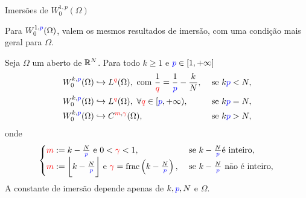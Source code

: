 \begin{frame}{Imersões de \(W_0^{1,p}(\Omega)\)}

Para \(W_0^{1,{\color{blue} p }}(\Omega)\), valem os mesmos resultados de imersão, com uma condição mais geral para \(\Omega\).

\begin{teo}
Seja \(\Omega\) um aberto de \(\mathbb{R}^N\). Para todo \(k\geq 1\) e \({\color{blue} p }\in [1,+\infty]\)
\begin{align*}
& W_0^{k,{\color{blue} p }}(\Omega)\hookrightarrow L^{\color{red} q }(\Omega), \text{ com } \frac{1}{{\color{red} q }}=\frac{1}{{\color{blue} p }}-\frac{k}{N},  &
 \text{ se } k{\color{blue} p }<N,\\
& W_0^{k,{\color{blue} p }}(\Omega)\hookrightarrow L^{\color{red} q }(\Omega),\ \forall {\color{red} q }\in [{\color{blue} p },+\infty),& \text{ se }  k{\color{blue} p }=N,\\
& W_0^{k,{\color{blue} p }}(\Omega)\hookrightarrow C^{{\color{red} m },{\color{red} \gamma }}(\Omega),
& \text{ se }  k{\color{blue} p }>N,
\end{align*}
onde 
\[
\begin{cases}
{\color{red}m}:= k-\frac{N}{{\color{blue} p}} 
\text{ e } 0< {\color{red} \gamma }<1,
& \text{ se } k-\frac{N}{{\color{blue} p }} \text{é inteiro},\\
{\color{red}m}:=\bigg\lfloor k-\frac{N}{{\color{blue} p }}\bigg\rfloor 
\text{ e } {\color{red} \gamma }=  \operatorname{frac}\left(k-\frac{N}{{\color{blue} p}}\right), 
& \text{ se } k-\frac{N}{{\color{blue} p }} \text{ não é inteiro},
\end{cases}
\]
A constante de imersão depende apenas de \(k, {\color{blue} p }, N\) e \(\Omega\).
\end{teo}


\end{frame}

